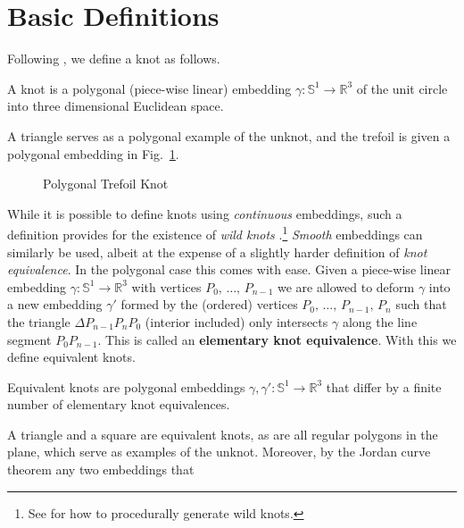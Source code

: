 \section{Basic Definitions}
    Following \cite[p.~15]{LivingstonKnotTheory}, we define a knot as follows.
    \begin{definition}
        A knot is a polygonal (piece-wise linear) embedding
        $\gamma:\mathbb{S}^{1}\rightarrow\mathbb{R}^{3}$ of the unit circle
        into three dimensional Euclidean space.
    \end{definition}
    A triangle serves as a polygonal example of the unknot, and the trefoil is
    given a polygonal embedding in Fig.~\ref{fig:trefoil_knot_polygonal}.
    \begin{figure}
        \centering
        \caption{Polygonal Trefoil Knot}
        \label{fig:trefoil_knot_polygonal}
    \end{figure}
    While it is possible to define knots using \textit{continuous} embeddings,
    such a definition provides for the existence of
    \textit{wild knots} \cite{FoxArtinWildKnots1948}.\footnote{%
        See \cite{BrowneWildKnots} for how to procedurally generate wild knots.
    }
    \textit{Smooth} embeddings can similarly be used, albeit at the expense of
    a slightly harder definition of \textit{knot equivalence}. In the polygonal
    case this comes with ease. Given a piece-wise linear embedding
    $\gamma:\mathbb{S}^{1}\rightarrow\mathbb{R}^{3}$ with vertices
    $P_{0},\,\dots,\,P_{n-1}$ we are allowed to deform $\gamma$ into a new
    embedding $\gamma'$ formed by the (ordered) vertices
    $P_{0},\,\dots,\,P_{n-1},\,P_{n}$
    such that the triangle $\Delta{P}_{n-1}P_{n}P_{0}$ (interior included)
    only intersects $\gamma$
    along the line segment $P_{0}P_{n-1}$. This is called an
    \textbf{elementary knot equivalence}. With this we define equivalent knots.
    \newpage
    \begin{definition}
        Equivalent knots are polygonal embeddings
        $\gamma,\gamma':\mathbb{S}^{1}\rightarrow\mathbb{R}^{3}$ that differ by
        a finite number of elementary knot equivalences.
    \end{definition}
    A triangle and a square are equivalent knots, as are all regular
    polygons in the plane, which serve as examples of the unknot.
    Moreover, by the Jordan curve theorem any two embeddings that
